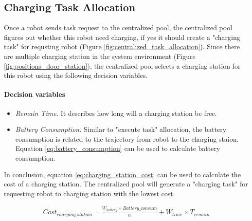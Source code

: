 \subsection{Charging Task Allocation}
Once a robot sends task request to the centralized pool, the centralized pool figures out whether this robot need charging, if yes it should create a "charging task" for requsting robot (Figure \ref{fig:centralized_task_allocation}). Since there are multiple charging station in the system environment (Figure \ref{fig:positions_door_station}), the centralized pool selects a charging station for this robot using the following decision variables.

\paragraph*{Decision variables}

\begin{itemize}
	\item \textsl{Remain Time.} It describes how long will a charging station be free. 
	\item \textsl{Battery Consumption.} Similar to "execute task" allocation, the battery consumption is related to the trajectory from robot to the charging staion. Equation \ref{eq:battery_consumption} can be used to calculate battery consumption.
\end{itemize}
In conclusion, equation \ref{eq:charging_station_cost} can be used to calculate the cost of a charging station. The centralized pool will generate a "charging task" for requesting robot to charging station with the lowest cost.

\begin{equation}
	\label{eq:charging_station_cost}
	\begin{split}
	Cost_{charging\_station} = \frac{W_{battery} \times Battery\_consum}{n} + W_{time} \times T_{remain}
	\end{split}
\end{equation}



